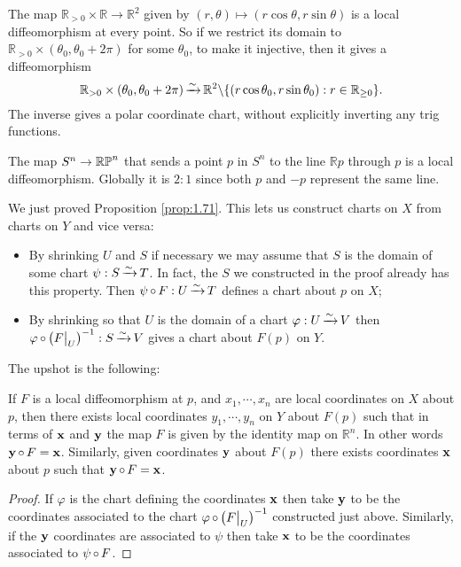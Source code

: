 \documentclass[a4paper,11pt]{article}
\begin{document}
	\begin{ex}
		The map $\mathbb{R}_{>0} \times \mathbb{R} \to \mathbb{R}^2$ given by $(r,\theta)\mapsto (r \cos \theta, r \sin \theta)$ is a local diffeomorphism at every point. So if we restrict its domain to $\mathbb{R}_{>0} \times (\theta_0 ,\theta_0 + 2 \pi)$ for some $\theta_0$, to make it injective, then it gives a diffeomorphism
		\[
			\mathbb{R}_{>0} \times (\theta_0 ,\theta_0 + 2 \pi) \operatorname{\xrightarrow{\sim}} \mathbb{R}^2 \backslash \{(r \cos \theta_0 , r \sin \theta_0): r \in \mathbb{R}_{\geq 0}\}.
		\]
		The inverse gives a polar coordinate chart, without explicitly inverting any trig functions.
	\end{ex}

	\begin{ex}
		The map $S^n \to \mathbb{RP}^{n}$ that sends a point $p$ in $S^n$ to the line $\mathbb{R} p $ through $p$ is a local diffeomorphism. Globally it is $2 : 1$ since both $p$ and $-p$ represent the same line.
	\end{ex}

	We just proved Proposition \ref{prop:1.71}. This lets us construct charts on $X$ from charts on $Y$ and vice versa:
	\begin{itemize}
		\item By shrinking $U$ and $S$ if necessary we may assume that $S$ is the domain of some chart $\psi : S \operatorname{\xrightarrow{\sim}} T$. In fact, the $S$ we constructed in the proof already has this property. Then $\psi \operatorname{\circ} F : U \operatorname{\xrightarrow{\sim}} T$ defines a chart about $p$ on $X$;
		\item By shrinking so that $U$ is the domain of a chart $\varphi: U \operatorname{\xrightarrow{\sim}} V$ then $\varphi \operatorname{\circ} \left( F\big|_U \right)^{-1} : S \operatorname{\xrightarrow{\sim}} V$ gives a chart about $F(p)$ on $Y$. 
	\end{itemize}

	The upshot is the following:

	\begin{lem}
		If $F$ is a local diffeomorphism at $p$, and $x_1, \cdots, x_n$ are local coordinates on $X$ about $p$, then there exists local coordinates $y_1, \cdots, y_n$ on $Y$ about $F(p)$ such that in terms of $\vb x$ and $\vb y$ the map $F$ is given by the identity map on $\mathbb{R}^n$. In other words $\vb y \operatorname{\circ} F = \vb x$. Similarly, given coordinates $\vb y$ about $F(p)$ there exists coordinates $\vb x$ about $p$ such that $\vb y \operatorname{\circ} F = \vb x$.
	\end{lem}
	\begin{proof}
		If $\varphi$ is the chart defining the coordinates $\vb x$ then take $\vb y$ to be the coordinates associated to the chart $\varphi \operatorname{\circ} \left( F \big|_U \right)^{-1}$ constructed just above. Similarly, if the $\vb y$ coordinates are associated to $\psi$ then take $\vb x$ to be the coordinates associated to $\psi \operatorname{\circ} F$. 
	\end{proof}
\end{document}

